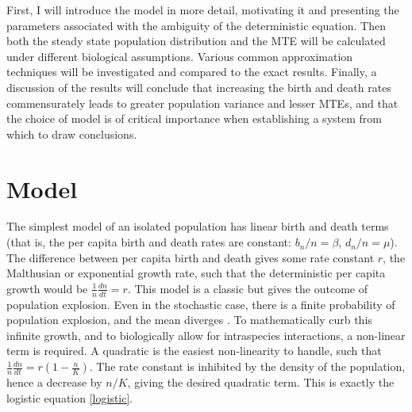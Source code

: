 First, I will introduce the model in more detail, motivating it and presenting the parameters associated with the ambiguity of the deterministic equation. 
Then both the steady state population distribution and the MTE will be calculated under different biological assumptions. 
Various common approximation techniques will be investigated and compared to the exact results. 
Finally, a discussion of the results will conclude that increasing the birth and death rates commensurately leads to greater population variance and lesser MTEs, and that the choice of model is of critical importance when establishing a system from which to draw conclusions. 





\section{Model}%

The simplest model of an isolated population has linear birth and death terms (that is, the per capita birth and death rates are constant: $b_n/n=\beta$, $d_n/n=\mu$). 
The difference between per capita birth and death gives some rate constant $r$, the Malthusian or exponential growth rate, such that the deterministic per capita growth would be $\frac{1}{n}\frac{dn}{dt} = r$. 
This model is a classic but gives the outcome of population explosion. 
Even in the stochastic case, there is a finite probability of population explosion, and the mean diverges \cite{Nisbet1982}. 
To mathematically curb this infinite growth, and to biologically allow for intraspecies interactions, a non-linear term is required. 
A quadratic is the easiest non-linearity to handle, such that $\frac{1}{n}\frac{dn}{dt} = r\left(1-\frac{n}{K}\right)$. 
The rate constant is inhibited by the density of the population, hence a decrease by $n/K$, giving the desired quadratic term. 
This is exactly the logistic equation \ref{logistic}. 


